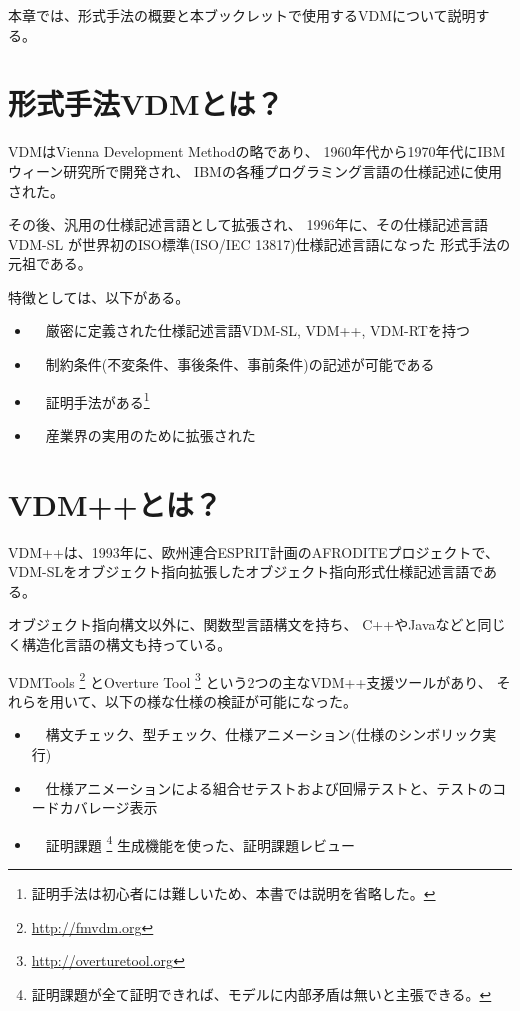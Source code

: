 本章では、形式手法の概要と本ブックレットで使用するVDMについて説明する。

\section{形式手法VDMとは？}
	\label{WhatIsVDM}
VDMはVienna Development Methodの略であり、
1960年代から1970年代にIBMウィーン研究所で開発され、
IBMの各種プログラミング言語の仕様記述に使用された。

その後、汎用の仕様記述言語として拡張され、
1996年に、その仕様記述言語VDM-SL\cite{Kyushu2016SL}
が世界初のISO標準(ISO/IEC 13817)仕様記述言語になった
形式手法の元祖である。


特徴としては、以下がある。

\begin{itemize}
	\item　厳密に定義された仕様記述言語VDM-SL, VDM++, VDM-RTを持つ
	\item　制約条件(不変条件、事後条件、事前条件)の記述が可能である
	\item　証明手法がある\footnote{証明手法は初心者には難しいため、本書では説明を省略した。}
	\item　産業界の実用のために拡張された
\end{itemize} 

\section{VDM++とは？}
	\label{WhatIsVDMPP}

VDM++\cite{Kyushu2016PP}は、1993年に、欧州連合ESPRIT計画のAFRODITEプロジェクトで、
VDM-SL\cite{Kyushu2016SL}をオブジェクト指向拡張したオブジェクト指向形式仕様記述言語である。

オブジェクト指向構文以外に、関数型言語構文を持ち、
C++やJavaなどと同じく構造化言語の構文も持っている。

VDMTools
	\footnote{\url{http://fmvdm.org}}
とOverture Tool
	\footnote{\url{http://overturetool.org}}
という2つの主なVDM++支援ツールがあり、
それらを用いて、以下の様な仕様の検証が可能になった。

\begin{itemize}
	\item　構文チェック、型チェック、仕様アニメーション(仕様のシンボリック実行)
	\item　仕様アニメーションによる組合せテストおよび回帰テストと、テストのコードカバレージ表示
	\item　証明課題
		\footnote{証明課題が全て証明できれば、モデルに内部矛盾は無いと主張できる。}
		生成機能を使った、証明課題レビュー
\end{itemize} 

